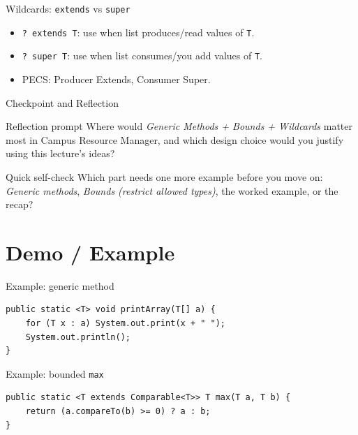 \documentclass{beamer}
\begin{document}
\begin{frame}{Wildcards: \texttt{extends} vs \texttt{super}}
  \begin{itemize}[<+->]
    \item \texttt{? extends T}: use when list produces/read values of \texttt{T}.
    \item \texttt{? super T}: use when list consumes/you add values of \texttt{T}.
    \item PECS: Producer Extends, Consumer Super.
  \end{itemize}
  \slidesources{\OOPSUnitIVSources}
\end{frame}

\begin{frame}{Checkpoint and Reflection}
\begin{block}{Reflection prompt}
Where would \textit{Generic Methods + Bounds + Wildcards} matter most in Campus Resource Manager, and which design choice would you justify using this lecture's ideas?
\end{block}
\begin{block}{Quick self-check}
Which part needs one more example before you move on: \textit{Generic methods}, \textit{Bounds (restrict allowed types)}, the worked example, or the recap?
\end{block}
  \slidesources{\OOPSUnitIVSources}
\end{frame}

\section{Demo / Example}
\label{sec:demo}

\begin{frame}[fragile]{Example: generic method}
\begin{lstlisting}
public static <T> void printArray(T[] a) {
    for (T x : a) System.out.print(x + " ");
    System.out.println();
}
\end{lstlisting}
  \slidesources{\OOPSUnitIVSources}
\end{frame}

\begin{frame}[fragile]{Example: bounded \texttt{max}}
\begin{lstlisting}
public static <T extends Comparable<T>> T max(T a, T b) {
    return (a.compareTo(b) >= 0) ? a : b;
}
\end{lstlisting}
  \slidesources{\OOPSUnitIVSources}
\end{frame}
\end{document}
